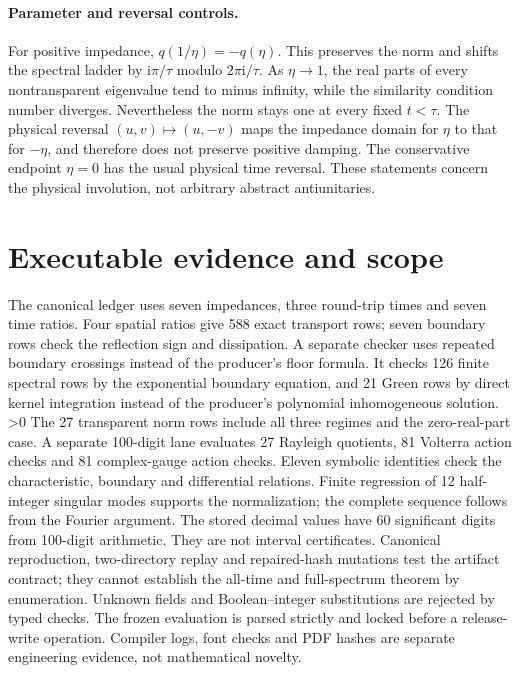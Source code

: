 \documentclass[10pt]{article}
\newcommand{\ii}{\mathrm i}
\begin{document}
\paragraph{Parameter and reversal controls.}
For positive impedance, $q(1/\eta)=-q(\eta)$. This preserves the norm and
shifts the spectral ladder by $\ii\pi/\tau$ modulo $2\pi\ii/\tau$.
As $\eta\to1$, the real parts of every nontransparent eigenvalue tend to
minus infinity, while the similarity condition number diverges. Nevertheless
the norm stays one at every fixed $t<\tau$. The physical reversal
$(u,v)\mapsto(u,-v)$ maps the impedance domain for $\eta$ to that for
$-\eta$, and therefore does not preserve positive damping. The conservative
endpoint $\eta=0$ has the usual physical time reversal. These statements
concern the physical involution, not arbitrary abstract antiunitaries.
\fi

\section{Executable evidence and scope}
The canonical ledger uses seven impedances, three round-trip times and
seven time ratios. Four spatial ratios give 588 exact transport rows;
seven boundary rows check the reflection sign and dissipation. A separate
checker uses repeated boundary crossings instead of the producer's floor
formula. It checks 126 finite spectral rows by the exponential boundary
equation, and 21 Green rows by direct kernel integration instead of the
producer's polynomial inhomogeneous solution.
\ifnum\CRevisionRound>0
The 27 transparent norm rows include all three regimes and the zero-real-part
case. A separate 100-digit lane evaluates 27 Rayleigh quotients,
81 Volterra action checks and 81 complex-gauge action checks. Eleven
symbolic identities check the characteristic, boundary and differential
relations. Finite regression of 12 half-integer singular modes supports the
normalization; the complete sequence follows from the Fourier argument.
\fi
The stored decimal values have 60 significant digits from 100-digit
arithmetic. They are not interval certificates. Canonical reproduction,
two-directory replay and repaired-hash mutations test the artifact contract;
they cannot establish the all-time and full-spectrum theorem by enumeration.
Unknown fields and Boolean--integer substitutions are rejected by typed
checks. The frozen evaluation is parsed strictly and locked before a
release-write operation. Compiler logs, font checks and PDF hashes are
separate engineering evidence, not mathematical novelty.
\end{document}
